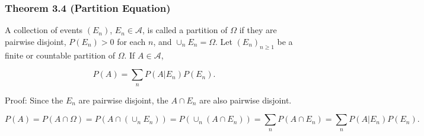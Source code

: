 \documentclass{article}
\begin{document}
\subsubsection*{Theorem 3.4 (Partition Equation)} A collection of events $(E_n)$, $E_n \in \mathcal{A}$, is called a partition of $\Omega$ if they are pairwise disjoint, $P(E_n) > 0$ for each $n$, and $\cup_{n} E_n = \Omega$. Let $(E_n)_{n\geq 1}$ be a finite or countable partition of $\Omega$. If $A \in \mathcal{A}$,

$$
P(A) = \sum_{n} P(A \vert E_n) P(E_n).
$$

Proof: Since the $E_n$ are pairwise disjoint, the $A \cap E_n$ are also pairwise disjoint.

$$
P(A) = P(A \cap \Omega) = P(A \cap (\cup_n E_n))
= P(\cup_n(A \cap E_n)) = \sum_n P(A \cap E_n) 
= \sum_n P(A \vert E_n)P(E_n).
$$
\end{document}

